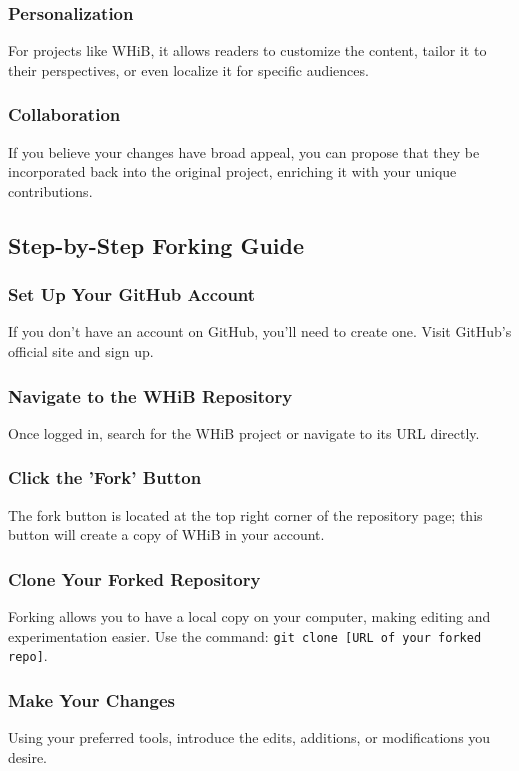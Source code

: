\documentclass{book}
\begin{document}
\subsubsection*{Personalization}
For projects like WHiB, it allows readers to customize the content, tailor it to their perspectives, or even localize it for specific audiences.

\subsubsection*{Collaboration}
If you believe your changes have broad appeal, you can propose that they be incorporated back into the original project, enriching it with your unique contributions.

\subsection*{Step-by-Step Forking Guide}
\subsubsection*{Set Up Your GitHub Account}
If you don't have an account on GitHub, you'll need to create one. Visit GitHub's official site and sign up.

\subsubsection*{Navigate to the WHiB Repository}
Once logged in, search for the WHiB project or navigate to its URL directly.

\subsubsection*{Click the 'Fork' Button}
The fork button is located at the top right corner of the repository page; this button will create a copy of WHiB in your account.

\subsubsection*{Clone Your Forked Repository}
Forking allows you to have a local copy on your computer, making editing and experimentation easier. Use the command: \texttt{git clone [URL of your forked repo]}.

\subsubsection*{Make Your Changes}
Using your preferred tools, introduce the edits, additions, or modifications you desire.
\end{document}
